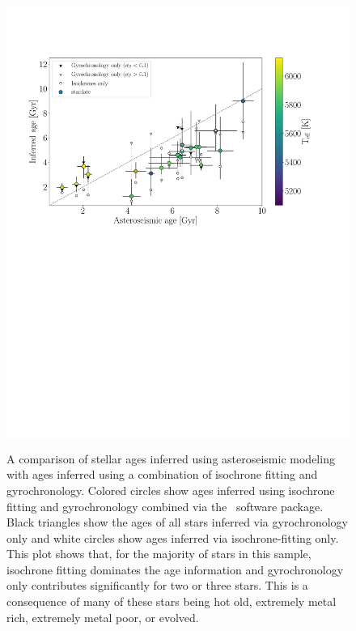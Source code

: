 \begin{figure}
    \caption{ A comparison of stellar ages inferred using
    asteroseismic modeling with ages inferred using a combination of isochrone
    fitting and gyrochronology.
Colored circles show ages inferred using isochrone fitting and gyrochronology
combined via the \sd\ software package.
Black triangles show the ages of all stars inferred via gyrochronology only
    and white circles show ages inferred via isochrone-fitting only.
This plot shows that, for the majority of stars in this sample, isochrone
    fitting dominates the age information and gyrochronology only contributes
    significantly for two or three stars.
This is a consequence of many of these stars being hot old, extremely metal
    rich, extremely metal poor, or evolved.
  }
  \centering
    \includegraphics[width=1.2\textwidth]{asteroseismic_results_nosdss_gaia}
\label{fig:astero}
\end{figure}
